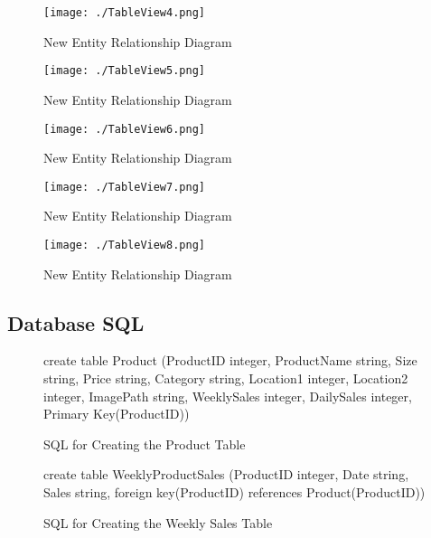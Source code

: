 \begin{figure}[H]
    \texttt{[image: ./TableView4.png]}
    \caption{New Entity Relationship Diagram} \label{fig:table-view-4}
\end{figure}

\begin{figure}[H]
    \texttt{[image: ./TableView5.png]}
    \caption{New Entity Relationship Diagram} \label{fig:table-view-5}
\end{figure}

\begin{figure}[H]
    \texttt{[image: ./TableView6.png]}
    \caption{New Entity Relationship Diagram} \label{fig:table-view-6}
\end{figure}

\begin{figure}[H]
    \texttt{[image: ./TableView7.png]}
    \caption{New Entity Relationship Diagram} \label{fig:table-view-7}
\end{figure}

\begin{figure}[H]
    \texttt{[image: ./TableView8.png]}
    \caption{New Entity Relationship Diagram} \label{fig:table-view-8}
\end{figure}


\subsection{Database SQL}

\begin{figure}[H]
	 \caption{SQL for Creating the Product Table} \label{fig:product-sql}
	\begin{sql}
	create table Product
              (ProductID integer,
              ProductName string,
              Size string,
              Price string,
              Category string,
              Location1 integer,
              Location2 integer,
              ImagePath string,
              WeeklySales integer,
              DailySales integer,
              Primary Key(ProductID))
	\end{sql}
\end{figure}

\begin{figure}[H]
	 \caption{SQL for Creating the Weekly Sales Table} \label{fig:weekly-sql}
	\begin{sql}
	create table WeeklyProductSales
          (ProductID integer,
          Date string,
          Sales string,
          foreign key(ProductID) references Product(ProductID))
	\end{sql}
\end{figure}


